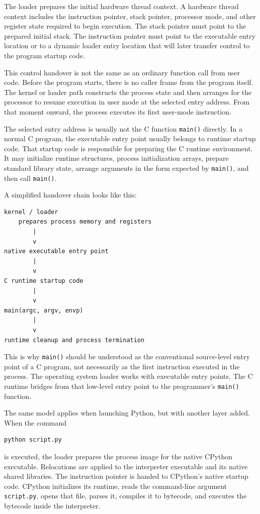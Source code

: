 The loader prepares the initial hardware thread context. A hardware thread context includes the instruction pointer, stack pointer, processor mode, and other register state required to begin execution. The stack pointer must point to the prepared initial stack. The instruction pointer must point to the executable entry location or to a dynamic loader entry location that will later transfer control to the program startup code.

This control handover is not the same as an ordinary function call from user code. Before the program starts, there is no caller frame from the program itself. The kernel or loader path constructs the process state and then arranges for the processor to resume execution in user mode at the selected entry address. From that moment onward, the process executes its first user-mode instruction.

The selected entry address is usually not the C function \texttt{main()} directly. In a normal C program, the executable entry point usually belongs to runtime startup code. That startup code is responsible for preparing the C runtime environment. It may initialize runtime structures, process initialization arrays, prepare standard library state, arrange arguments in the form expected by \texttt{main()}, and then call \texttt{main()}.

A simplified handover chain looks like this:

\begin{verbatim}
kernel / loader
    prepares process memory and registers
        |
        v
native executable entry point
        |
        v
C runtime startup code
        |
        v
main(argc, argv, envp)
        |
        v
runtime cleanup and process termination
\end{verbatim}

This is why \texttt{main()} should be understood as the conventional source-level entry point of a C program, not necessarily as the first instruction executed in the process. The operating system loader works with executable entry points. The C runtime bridges from that low-level entry point to the programmer's \texttt{main()} function.

The same model applies when launching Python, but with another layer added. When the command

\begin{verbatim}
python script.py
\end{verbatim}

is executed, the loader prepares the process image for the native CPython executable. Relocations are applied to the interpreter executable and its native shared libraries. The instruction pointer is handed to CPython's native startup code. CPython initializes its runtime, reads the command-line argument \texttt{script.py}, opens that file, parses it, compiles it to bytecode, and executes the bytecode inside the interpreter.

